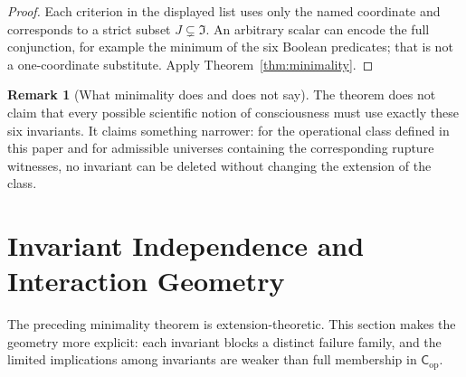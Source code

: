 \documentclass[11pt,a4paper]{article}
\theoremstyle{definition}
\newtheorem{remark}[theorem]{Remark}
\newcommand{\Cop}{\mathsf{C}_{\mathrm{op}}}
\begin{document}
\begin{proof}
Each criterion in the displayed list uses only the named coordinate and corresponds to a strict subset $J \subsetneq \mathfrak{I}$. An arbitrary scalar can encode the full conjunction, for example the minimum of the six Boolean predicates; that is not a one-coordinate substitute. Apply Theorem~\ref{thm:minimality}.
\end{proof}

\begin{remark}[What minimality does and does not say]
The theorem does not claim that every possible scientific notion of consciousness must use exactly these six invariants. It claims something narrower: for the operational class defined in this paper and for admissible universes containing the corresponding rupture witnesses, no invariant can be deleted without changing the extension of the class.
\end{remark}

\section{Invariant Independence and Interaction Geometry}
The preceding minimality theorem is extension-theoretic. This section makes the
geometry more explicit: each invariant blocks a distinct failure family, and the
limited implications among invariants are weaker than full membership in
$\Cop$.
\end{document}
